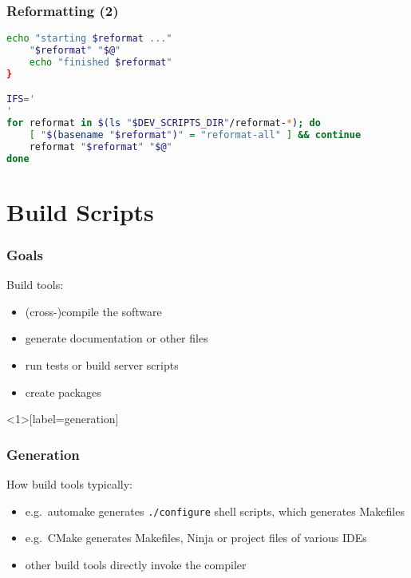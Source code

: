 \begin{frame}[fragile]
	\frametitle{Reformatting (2)}

	\begin{lstlisting}[language=sh]
	echo "starting $reformat ..."
	"$reformat" "$@"
	echo "finished $reformat"
}

IFS='
'
for reformat in $(ls "$DEV_SCRIPTS_DIR"/reformat-*); do
	[ "$(basename "$reformat")" = "reformat-all" ] && continue
	reformat "$reformat" "$@"
done\end{lstlisting}
\end{frame}

\section{Build Scripts}

\begin{frame}[label=build script goals]
	\frametitle{Goals}

	Build tools:

	\begin{itemize}[<+-| alert@+>]
	\item (cross-)compile the software
	\item generate documentation or other files
	\item run tests or build server scripts
	\item create packages
	\end{itemize}
\end{frame}

\begin{frame}<1>[label=generation]
	\frametitle{Generation}

	How build tools typically:

	\begin{itemize}[<+-| alert@+>]
	\item e.g.\ automake generates \texttt{./configure} shell scripts, which generates Makefiles
	\item e.g.\ CMake generates Makefiles, Ninja or project files of various IDEs
	\item other build tools directly invoke the compiler
	\end{itemize}

\end{frame}

